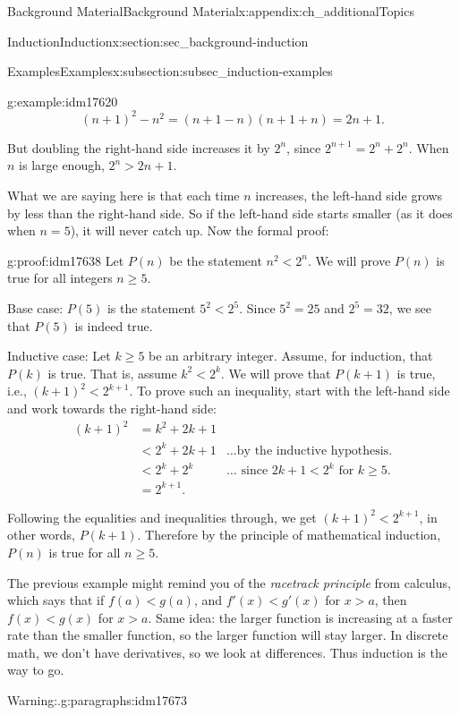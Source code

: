 \documentclass[oneside,10pt,]{book}
\numberwithin{equation}{chapter}
\newcommand{\lt}{<}
\newcommand{\amp}{&}
\begin{document}
\begin{appendixptx}{Background Material}{}{Background Material}{}{}{x:appendix:ch_additionalTopics}
\begin{sectionptx}{Induction}{}{Induction}{}{}{x:section:sec_background-induction}
\begin{subsectionptx}{Examples}{}{Examples}{}{}{x:subsection:subsec_induction-examples}
\begin{example}{}{g:example:idm17620}
\begin{equation*}
(n+1)^2 - n^2 = (n+1-n)(n+1+n) = 2n+1.
\end{equation*}
%
\par
But doubling the right-hand side increases it by \(2^n\), since \(2^{n+1} = 2^n + 2^n\). When \(n\) is large enough, \(2^n > 2n + 1\).%
\par
What we are saying here is that each time \(n\) increases, the left-hand side grows by less than the right-hand side. So if the left-hand side starts smaller (as it does when \(n = 5\)), it will never catch up. Now the formal proof:%
\begin{proofptx}{}{g:proof:idm17638}
Let \(P(n)\) be the statement \(n^2 \lt  2^n\). We will prove \(P(n)\) is true for all integers \(n \ge 5\).%
\par
Base case: \(P(5)\) is the statement \(5^2 \lt  2^5\). Since \(5^2 = 25\) and \(2^5 = 32\), we see that \(P(5)\) is indeed true.%
\par
Inductive case: Let \(k \ge 5\) be an arbitrary integer. Assume, for induction, that \(P(k)\) is true. That is, assume \(k^2 \lt  2^k\). We will prove that \(P(k+1)\) is true, i.e., \((k+1)^2 \lt  2^{k+1}\). To prove such an inequality, start with the left-hand side and work towards the right-hand side:%
\begin{align*}
(k+1)^2 \amp = k^2 + 2k + 1 \amp\\
\amp \lt 2^k + 2k + 1 \amp \ldots\text{by the inductive hypothesis.}\\
\amp \lt 2^k + 2^k \amp \ldots\text{ since } 2k + 1 \lt  2^k \text{ for }k \ge 5.\\
\amp = 2^{k+1}. \amp
\end{align*}
%
\par
Following the equalities and inequalities through, we get \((k+1)^2 \lt  2^{k+1}\), in other words, \(P(k+1)\). Therefore by the principle of mathematical induction, \(P(n)\) is true for all \(n \ge 5\).%
\end{proofptx}
\end{example}
The previous example might remind you of the \emph{racetrack principle} from calculus, which says that if \(f(a) \lt  g(a)\), and \(f'(x) \lt  g'(x)\) for \(x > a\), then \(f(x) \lt  g(x)\) for \(x > a\). Same idea: the larger function is increasing at a faster rate than the smaller function, so the larger function will stay larger. In discrete math, we don't have derivatives, so we look at differences. Thus induction is the way to go.%
\begin{paragraphs}{Warning:.}{g:paragraphs:idm17673}%

\end{paragraphs}
\end{subsectionptx}
\end{sectionptx}
\end{appendixptx}
\end{document}
